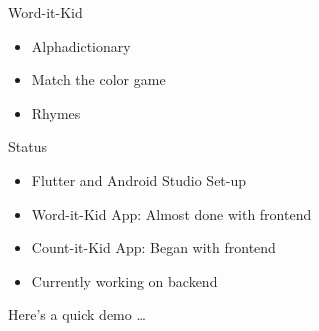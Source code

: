 \documentclass[14pt]{beamer}
\begin{document}
\begin{frame}{Word-it-Kid}
    \begin{itemize}
        \item Alphadictionary
            \pause
        \item Match the color game
            \pause
        \item Rhymes
    \end{itemize}
\end{frame}

\begin{frame}{Status}
    \begin{itemize}
        \item Flutter and Android Studio Set-up
        \item Word-it-Kid App: Almost done with frontend
        \item Count-it-Kid App: Began with frontend
        \item Currently working on backend
    \end{itemize}
\end{frame}

\begin{frame}[standout]
    Here's a quick demo \ldots
\end{frame}
\end{document}
